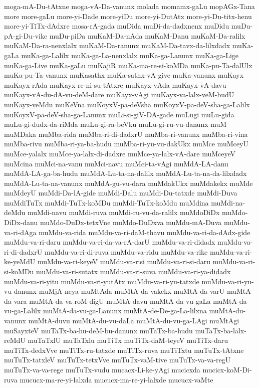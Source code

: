 {moga-mA-Du-tAtxne
moga-vA-Da-vanunx
molada
momamx-gaLu
mopAGx-Tana
more
more-gaLu
more-yi-Dade
more-yiDu
more-yi-DutAtx
more-yi-Du-titx-henu
more-yi-TiTx-dAdxre
mosa-rA-gada
muDida
muDi-da-dadxnenx
muDidu
muDu-pA-gi-Du-vike
muDu-piDa
muKaM-Da-nAda
muKaM-Danu
muKaM-Da-ralilx
muKaM-Da-ra-nenxlalx
muKaM-Da-ranunx
muKaM-Da-tavx-da-lilxdadx
muKa-gaLa
muKa-ga-Lalilx
muKa-ga-La-nenxlalx
muKa-ga-Lanunx
muKa-ga-Lige
muKa-ga-Live
muKa-gaLu
muKajiR
muKa-ma-re-si-koMDa
muKa-pu-Ta-dalUlx
muKa-pu-Ta-vanunx
muKasathx
muKa-sathx-vA-give
muKa-vanunx
muKayx
muKayx-rAda
muKayx-re-ni-su-tAtxre
muKayx-vAda
muKayx-vA-davu
muKayx-vA-du-dA-vu-deM-dare
muKayx-vAgi
muKayx-va-lalx-veM-budU
muKayx-veMdu
muKeVna
muKoyxV-pa-deVsha
muKoyxV-pa-deV-sha-ga-Lalilx
muKoyxV-pa-deV-sha-ga-Lanunx
muLi-si-giV-DA-gade
muLugi
muLu-gida
muLu-gi-dudx-da-riMda
muLu-gi-ra-beVku
muLu-gi-ru-vu-danunx
muM
muMDaka
muMba-rida
muMba-ri-di-dadxrU
muMba-ri-vanunx
muMba-ri-vina
muMba-rivu
muMba-ri-ya-ba-hudu
muMba-ri-yu-vu-dakUkx
muMce
muMceyU
muMce-yalalx
muMce-ya-lalx-di-dadxre
muMce-ya-lalx-vA-dare
muMceyeV
muMcina
muMci-na-vanu
muMci-navu
muMci-ta-vAgi
muMdA-LA-danu
muMdA-LA-ga-ba-hudu
muMdA-Lu-ta-na-dalilx
muMdA-Lu-ta-na-da-lilxdadx
muMdA-Lu-ta-na-vanunx
muMdA-gu-vu-dara
muMdakUkx
muMdakekx
muMde
muMdeyU
muMdi-Da-lA-gide
muMdi-Dalu
muMdi-Du-tatxde
muMdi-Duva
muMdiTuTx
muMdi-TuTx-koMDu
muMdi-TuTx-koMdu
muMdina
muMdi-na-deMdu
muMdi-navu
muMdi-ruva
muMdi-ru-vu-da-ralilx
muMdoDiDx
muMdo-DiDx-danu
muMdo-DuDx-tetxVne
muMdo-DuDxva
muMdu-mA-Duva
muMdu-va-ri-dAga
muMdu-va-rida
muMdu-va-ri-daM-thavu
muMdu-va-ri-da-dAdx-gide
muMdu-va-ri-daru
muMdu-va-ri-da-va-rA-darU
muMdu-va-ri-didadx
muMdu-va-ri-di-dadxrU
muMdu-va-ri-di-ruva
muMdu-va-ridu
muMdu-va-rike
muMdu-va-ri-ke-yeMdU
muMdu-va-ri-keyeV
muMdu-va-risi
muMdu-va-ri-si-daru
muMdu-va-ri-si-koMDu
muMdu-va-ri-sutatx
muMdu-va-ri-suva
muMdu-va-ri-ya-didadx
muMdu-va-ri-yitu
muMdu-va-ri-yutAtx
muMdu-va-ri-yu-tatxde
muMdu-va-ri-yu-vu-danunx
muMjA-neya
muMtAda
muMtA-da-vakekx
muMtA-da-varU
muMtA-da-vara
muMtA-da-va-roM-digU
muMtA-davu
muMtA-da-vu-gaLa
muMtA-da-vu-ga-Lalilx
muMtA-da-vu-ga-Lanunx
muMtA-de-De-ga-La-lilxna
muMtA-du-vanunx
muMtA-duvu
muMtA-du-vu-daLa
muMtA-du-vu-ga-LAgi
muMtAgi
muSayxteV
muTaTx-ba-hu-deM-bu-danunx
muTaTx-ba-hudu
muTaTx-ba-lalx-reMdU
muTaTxlU
muTaTxlu
muTiTx
muTiTx-daM-teyeV
muTiTx-daru
muTiTx-dedxVve
muTiTx-ru-tatxde
muTiTx-ruva
muTiTxtu
muTuTx-tAtxne
muTuTx-tatxleV
muTuTx-tetxVve
muTuTx-vaM-tive
muTuTx-va-va-regU
muTuTx-va-va-rege
muTuTx-vudu
mucacx-Li-ke-yAgi
mucicxda
mucicx-koM-Di-ruva
mucucx-ma-re-yi-lalxda
mucucx-ma-re-yi-lalxde
mucucx-vaMte
}
